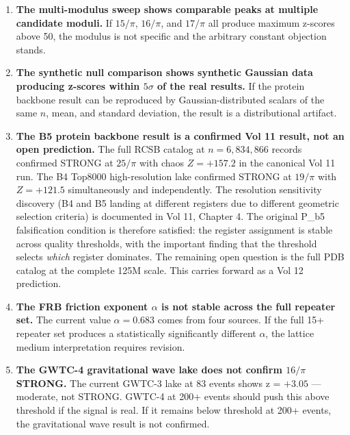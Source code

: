 \documentclass[11pt, letterpaper, openany]{book}
\begin{document}
\begin{enumerate}
    \item \textbf{The multi-modulus sweep shows comparable peaks at
    multiple candidate moduli.} If $15/\pi$, $16/\pi$, and $17/\pi$
    all produce maximum z-scores above 50, the modulus is not specific
    and the arbitrary constant objection stands.

    \item \textbf{The synthetic null comparison shows synthetic Gaussian
    data producing z-scores within $5\sigma$ of the real results.}
    If the protein backbone result can be reproduced by Gaussian-distributed
    scalars of the same $n$, mean, and standard deviation, the result
    is a distributional artifact.

    \item \textbf{The B5 protein backbone result is a confirmed Vol 11
    result, not an open prediction.} The full RCSB catalog at
    $n = 6{,}834{,}866$ records confirmed STRONG at $25/\pi$ with
    chaos $Z = +157.2$ in the canonical Vol 11 run. The B4 Top8000
    high-resolution lake confirmed STRONG at $19/\pi$ with
    $Z = +121.5$ simultaneously and independently. The resolution
    sensitivity discovery (B4 and B5 landing at different registers
    due to different geometric selection criteria) is documented in
    Vol 11, Chapter 4. The original P\_b5 falsification condition
    is therefore satisfied: the register assignment is stable across
    quality thresholds, with the important finding that the threshold
    selects \textit{which} register dominates. The remaining open
    question is the full PDB catalog at the complete 125M scale.
    This carries forward as a Vol 12 prediction.

    \item \textbf{The FRB friction exponent $\alpha$ is not stable
    across the full repeater set.} The current value $\alpha = 0.683$
    comes from four sources. If the full 15+ repeater set produces
    a statistically significantly different $\alpha$, the lattice
    medium interpretation requires revision.

    \item \textbf{The GWTC-4 gravitational wave lake does not confirm
    $16/\pi$ STRONG.} The current GWTC-3 lake at 83 events shows
    z = $+3.05$ --- moderate, not STRONG. GWTC-4 at 200+ events should
    push this above threshold if the signal is real. If it remains
    below threshold at 200+ events, the gravitational wave result is
    not confirmed.
\end{enumerate}
\end{document}
